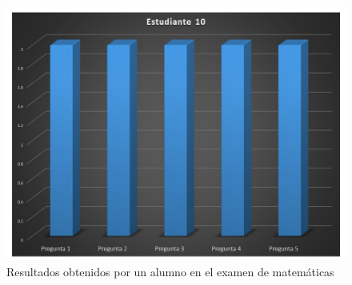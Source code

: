 \documentclass[12pt] {report}
\begin{document}
\begin{figure}[H]
\centering 
\includegraphics[scale=.7]{MEstudiante10.JPG}
\caption{Resultados obtenidos por un alumno en el examen de matemáticas}
\end{figure}
\end{document}
